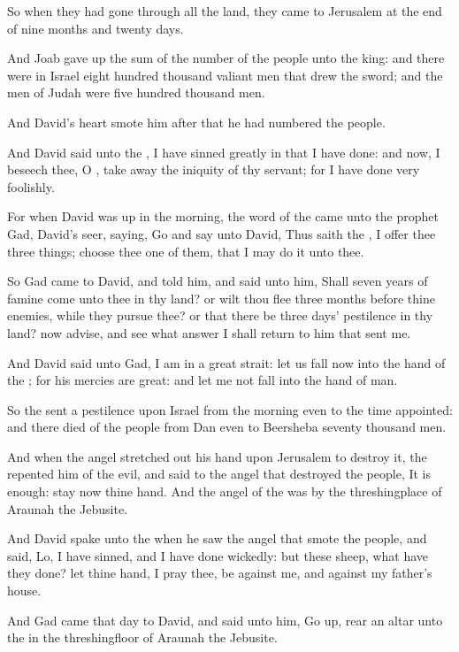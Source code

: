 \verse So when they had gone through all the land, they came to Jerusalem at the end of nine months and twenty days.

\verse And Joab gave up the sum of the number of the people unto the king: and there were in Israel eight hundred thousand valiant men that drew the sword; and the men of Judah were five hundred thousand men.

\verse And David's heart smote him after that he had numbered the people.

And David said unto the \LORD, I have sinned greatly in that I have done: and now, I beseech thee, O \LORD, take away the iniquity of thy servant; for I have done very foolishly.

\verse For when David was up in the morning, the word of the \LORD came unto the prophet Gad, David's seer, saying, \verse Go and say unto David, Thus saith the \LORD, I offer thee three things; choose thee one of them, that I may do it unto thee.

\verse So Gad came to David, and told him, and said unto him, Shall seven years of famine come unto thee in thy land? or wilt thou flee three months before thine enemies, while they pursue thee? or that there be three days' pestilence in thy land? now advise, and see what answer I shall return to him that sent me.

\verse And David said unto Gad, I am in a great strait: let us fall now into the hand of the \LORD; for his mercies are great: and let me not fall into the hand of man.

\verse So the \LORD sent a pestilence upon Israel from the morning even to the time appointed: and there died of the people from Dan even to Beersheba seventy thousand men.

\verse And when the angel stretched out his hand upon Jerusalem to destroy it, the \LORD repented him of the evil, and said to the angel that destroyed the people, It is enough: stay now thine hand. And the angel of the \LORD was by the threshingplace of Araunah the Jebusite.

\verse And David spake unto the \LORD when he saw the angel that smote the people, and said, Lo, I have sinned, and I have done wickedly: but these sheep, what have they done? let thine hand, I pray thee, be against me, and against my father's house.

\verse And Gad came that day to David, and said unto him, Go up, rear an altar unto the \LORD in the threshingfloor of Araunah the Jebusite.

